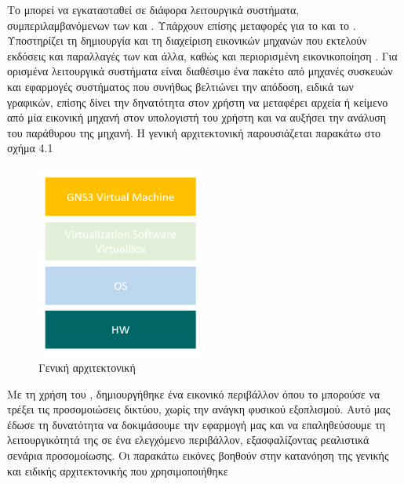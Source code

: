 Το  μπορεί να εγκατασταθεί σε διάφορα λειτουργικά συστήματα, συμπεριλαμβανόμενων των  και .
Υπάρχουν επίσης μεταφορές για το  και το .
Υποστηρίζει τη δημιουργία και τη διαχείριση εικονικών μηχανών που εκτελούν εκδόσεις και παραλλαγές των 
και άλλα, καθώς και περιορισμένη εικονικοποίηση .
Για ορισμένα λειτουργικά συστήματα είναι διαθέσιμο ένα πακέτο  από μηχανές συσκευών και εφαρμογές συστήματος
που συνήθως βελτιώνει την απόδοση, ειδικά των γραφικών, επίσης δίνει την δηνατότητα στον χρήστη να μεταφέρει αρχεία ή κείμενο από μία εικονική μηχανή στον υπολογιστή του χρήστη και να αυξήσει την ανάλυση του παράθυρου της μηχανή. 
Η γενική αρχιτεκτονική παρουσιάζεται παρακάτω στο σχήμα 4.1

\begin{figure}[htb]
	\centering
	\includegraphics[width=0.5\textwidth]{graphics/Architecture_virtualbox.PNG}
	\caption{ Γενική αρχιτεκτονική}
\end{figure}

Με τη χρήση του , δημιουργήθηκε ένα εικονικό περιβάλλον όπου το  μπορούσε να τρέξει τις προσομοιώσεις δικτύου, χωρίς την ανάγκη φυσικού εξοπλισμού. Αυτό μας έδωσε τη δυνατότητα να δοκιμάσουμε την εφαρμογή μας και να επαληθεύσουμε τη λειτουργικότητά της σε ένα ελεγχόμενο περιβάλλον, εξασφαλίζοντας ρεαλιστικά σενάρια προσομοίωσης.
Οι παρακάτω εικόνες βοηθούν στην κατανόηση της γενικής και ειδικής αρχιτεκτονικής που χρησιμοποιήθηκε



\FloatBarrier

